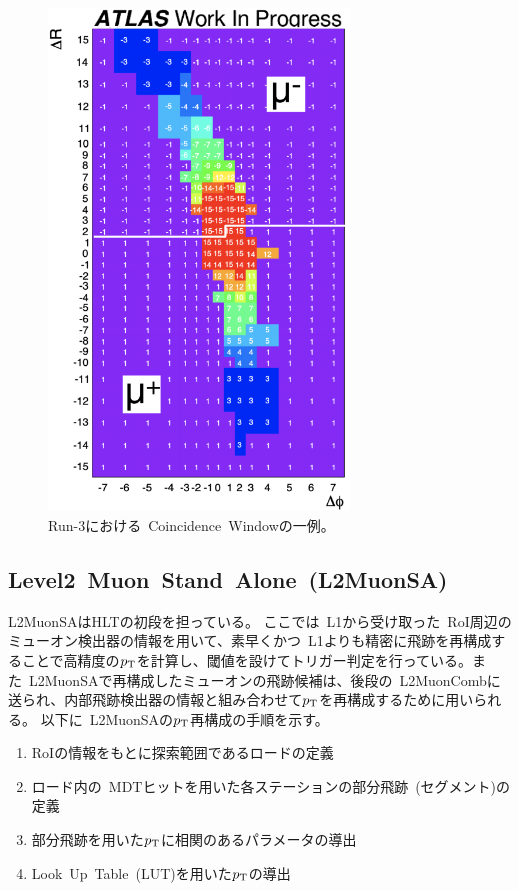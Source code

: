 \begin{figure}[h]
  \centering
  \includegraphics[clip, width=8cm]{fig/3/Run3CW.pdf}
  \caption{Run-3における~Coincidence~Windowの一例\cite{article:shiomi}。}
  \label{fig:3-5}
\end{figure}


\subsection{Level2~Muon~Stand~Alone~(L2MuonSA)}\label{chapter3-2-2}
L2MuonSAはHLTの初段を担っている。
ここでは~L1から受け取った~RoI周辺のミューオン検出器の情報を用いて、素早くかつ~L1よりも精密に飛跡を再構成することで高精度の$p_\mathrm{T}$を計算し、閾値を設けてトリガー判定を行っている。また~L2MuonSAで再構成したミューオンの飛跡候補は、後段の~L2MuonCombに送られ、内部飛跡検出器の情報と組み合わせて$p_\mathrm{T}$を再構成するために用いられる。
以下に~L2MuonSAの$p_\mathrm{T}$再構成の手順を示す。
\begin{enumerate}
    \item RoIの情報をもとに探索範囲であるロードの定義
    \item ロード内の~MDTヒットを用いた各ステーションの部分飛跡~(セグメント)の定義
    \item 部分飛跡を用いた$p_\mathrm{T}$に相関のあるパラメータの導出
    \item Look~Up~Table~(LUT)を用いた$p_\mathrm{T}$の導出
\end{enumerate}

